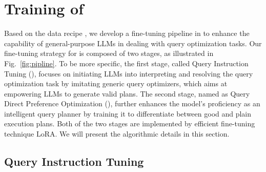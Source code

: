 \section{Training of \LLMQO}
\label{sec:method:training}
Based on the data recipe \QueryInstruct, we develop a fine-tuning pipeline in \LLMQO to enhance the capability of general-purpose LLMs in dealing with  query optimization tasks. 
Our fine-tuning strategy for \LLMQO is composed of two stages, as illustrated in Fig.~\ref{fig:pipline}.
To be more specific, the first stage, called Query Instruction Tuning (\QIT), focuses on initiating LLMs into interpreting and resolving the query optimization task by imitating generic query optimizers, which aims at empowering LLMs to generate valid plans. 
The second stage, named as Query Direct Preference Optimization (\QDPO), further enhances the model's proficiency as an intelligent query planner by training it to differentiate between good and plain execution plans.
Both of the two stages are implemented by efficient fine-tuning technique LoRA. 
%
We will present the algorithmic details in this section.

\subsection{Query Instruction Tuning}

